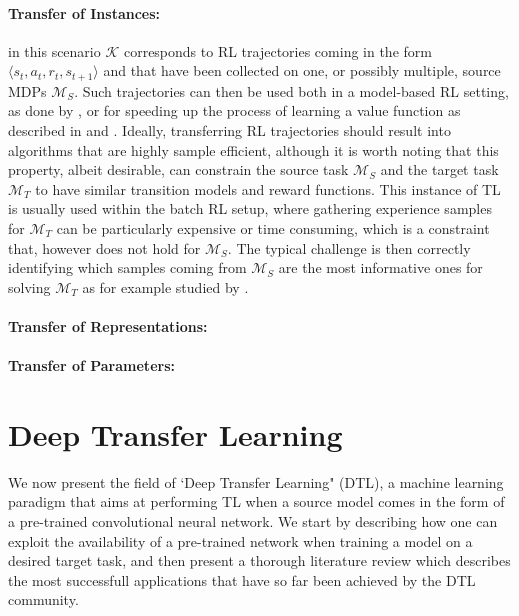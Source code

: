 \paragraph{Transfer of Instances:} in this scenario $\mathcal{K}$ corresponds to RL trajectories coming in the form $\langle s_t, a_t, r_t, s_{t+1}\rangle$ and that have been collected on one, or possibly multiple, source MDPs $\mathcal{M}_S$. Such trajectories can then be used both in a model-based RL setting, as done by \citet{taylor2008transferring}, or for speeding up the process of learning a value function as described in \cite{lazaric2008transfer} and \cite{laroche2017transfer}. Ideally, transferring RL trajectories should result into algorithms that are highly sample efficient, although it is worth noting that this property, albeit desirable, can constrain the source task $\mathcal{M}_S$ and the target task $\mathcal{M}_T$ to have similar transition models and reward functions. This instance of TL is usually used within the batch RL setup, where gathering experience samples for $\mathcal{M}_T$ can be particularly expensive or time consuming, which is a constraint that, however does not hold for $\mathcal{M}_S$. The typical challenge is then correctly identifying which samples coming from $\mathcal{M}_S$ are the most informative ones for solving $\mathcal{M}_T$ as for example studied by \citet{tirinzoni2018importance}.

\paragraph{Transfer of Representations:}
\paragraph{Transfer of Parameters:}


\section{Deep Transfer Learning}
\label{sec:literature_review}

We now present the field of `Deep Transfer Learning" (DTL), a machine learning paradigm that aims at performing TL when a source model comes in the form of a pre-trained convolutional neural network. We start by describing how one can exploit the availability of a pre-trained network when training a model on a desired target task, and then present a thorough literature review which describes the most successfull applications that have so far been achieved by the DTL community.

